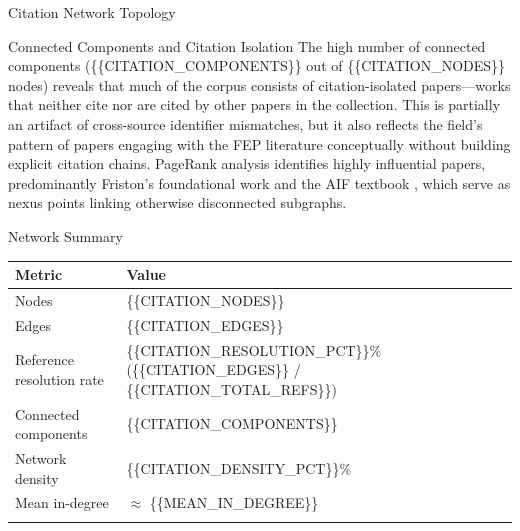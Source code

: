\documentclass[
  ignorenonframetext,
]{beamer}
\newcounter{none} %
\begin{document}
\begin{frame}{Citation Network Topology \label{sec:citation_network}}
\begin{block}{Connected Components and Citation Isolation}
\protect{}\label{connected-components-and-citation-isolation}
The high number of connected components (\{\{CITATION\_COMPONENTS\}\}
out of \{\{CITATION\_NODES\}\} nodes) reveals that much of the corpus
consists of citation-isolated papers---works that neither cite nor are
cited by other papers in the collection. This is partially an artifact
of cross-source identifier mismatches, but it also reflects the field's
pattern of papers engaging with the FEP literature conceptually without
building explicit citation chains. PageRank analysis identifies highly
influential papers, predominantly Friston's foundational work
\citep{friston2010free} and the AIF textbook \citep{parr2022active},
which serve as nexus points linking otherwise disconnected subgraphs.
\end{block}

\begin{block}{Network Summary}
\protect{}\label{network-summary}
{\def\LTcaptype{none} %
\begin{longtable}[]{@{}
  >{\raggedright\arraybackslash}p{}
  >{\raggedright\arraybackslash}p{}@{}}
\toprule\noalign{}
\begin{minipage}[b]{\linewidth}\raggedright
Metric
\end{minipage} & \begin{minipage}[b]{\linewidth}\raggedright
Value
\end{minipage} \\
\midrule\noalign{}
\endhead
Nodes & \{\{CITATION\_NODES\}\} \\
Edges & \{\{CITATION\_EDGES\}\} \\
Reference resolution rate & \{\{CITATION\_RESOLUTION\_PCT\}\}\%
(\{\{CITATION\_EDGES\}\} / \{\{CITATION\_TOTAL\_REFS\}\}) \\
Connected components & \{\{CITATION\_COMPONENTS\}\} \\
Network density & \{\{CITATION\_DENSITY\_PCT\}\}\% \\
Mean in-degree & \(\approx\) \{\{MEAN\_IN\_DEGREE\}\} \\
\bottomrule\noalign{}
\end{longtable}
}
\end{block}
\end{frame}
\end{document}
